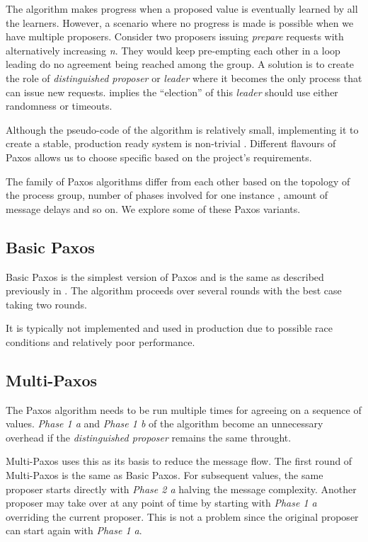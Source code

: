 The algorithm makes progress when a proposed value is eventually learned by all
the learners. However, a scenario where no progress is made is possible when we 
have multiple proposers. Consider two proposers issuing \emph{prepare} requests
with alternatively increasing \emph{n}. They would keep pre-empting each other
in a loop leading do no agreement being reached among the group. A solution is
to create the role of \emph{distinguished proposer} or \emph{leader} where it
becomes the only process that can issue new requests. \citet{FisLynPat85}
implies the ``election'' of this \emph{leader} should use either randomness
or timeouts.

Although the pseudo-code of the algorithm is relatively small, implementing it
to create a stable, production ready system is non-trivial \citep{ChandraGR07}.
Different flavours of Paxos allows us to choose specific based on the project's
requirements.

The family of Paxos algorithms differ from each other based on the topology
of the process group, number of phases involved for one instance%
, amount of message delays and so on. We explore some of these Paxos variants.

\subsection{Basic Paxos}

Basic Paxos is the simplest version of Paxos and is the same as described 
previously in . The algorithm proceeds over several rounds
with the best case taking two rounds.

It is typically not implemented and used in production due to possible race
conditions and relatively poor performance.

\subsection{Multi-Paxos}

The Paxos algorithm needs to be run multiple times for agreeing on a sequence of
values. \emph{Phase 1 a} and \emph{Phase 1 b} of the algorithm become 
an unnecessary overhead if the \emph{distinguished proposer} remains the same 
throught.

Multi-Paxos uses this as its basis to reduce the message flow. The first round 
of Multi-Paxos is the same as Basic Paxos. For subsequent values, the same
proposer starts directly with \emph{Phase 2 a} halving the message complexity.
Another proposer may take over at any point of time by starting with 
\emph{Phase 1 a} overriding the current proposer. This is not a problem since 
the original proposer can start again with \emph{Phase 1 a}.

